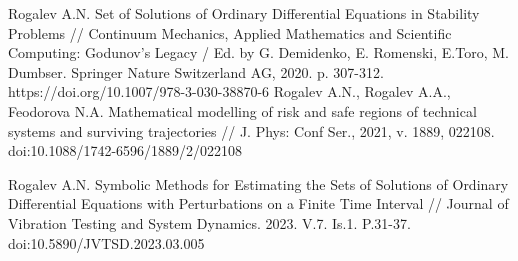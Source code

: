 \begin{thebibliography}{9}


Rogalev A.N.   Set of Solutions of Ordinary Differential Equations in Stability Problems // Continuum Mechanics, Applied Mathematics and Scientific Computing: Godunov's Legacy / Ed. by G. Demidenko, E. Romenski, E.Toro, M. Dumbser. Springer Nature Switzerland AG, 2020. p. 307-312. https://doi.org/10.1007/978-3-030-38870-6
Rogalev A.N., Rogalev A.A., Feodorova N.A.
Mathematical modelling of risk and safe regions of technical systems and surviving trajectories // J. Phys: Conf Ser., 2021, v. 1889, 022108. doi:10.1088/1742-6596/1889/2/022108

 Rogalev A.N. Symbolic Methods for Estimating the Sets of Solutions of Ordinary Differential Equations with Perturbations on a Finite Time Interval // Journal of Vibration Testing and System Dynamics. 2023. V.7. Is.1. P.31-37. doi:10.5890/JVTSD.2023.03.005

\end{thebibliography}




%